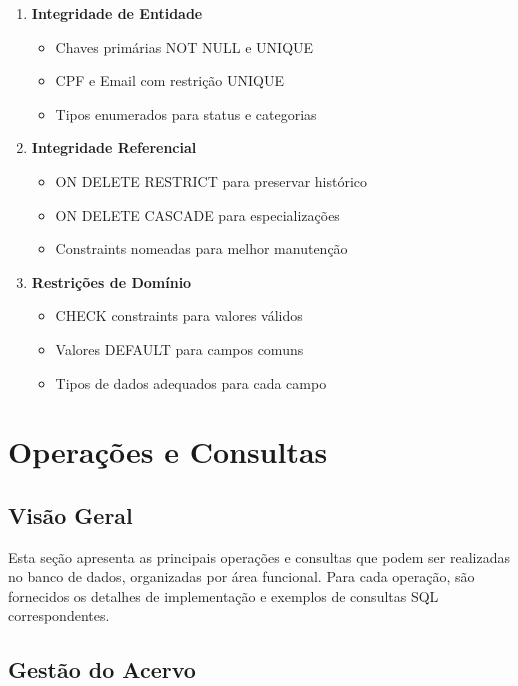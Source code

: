 \documentclass[12pt,a4paper]{article}
\begin{document}
\begin{tcolorbox}[title=Principais Restrições]
\begin{enumerate}[label=\textbf{RI\arabic*.}]
    \item \textbf{Integridade de Entidade}
    \begin{itemize}
        \item Chaves primárias NOT NULL e UNIQUE
        \item CPF e Email com restrição UNIQUE
        \item Tipos enumerados para status e categorias
    \end{itemize}

    \item \textbf{Integridade Referencial}
    \begin{itemize}
        \item ON DELETE RESTRICT para preservar histórico
        \item ON DELETE CASCADE para especializações
        \item Constraints nomeadas para melhor manutenção
    \end{itemize}

    \item \textbf{Restrições de Domínio}
    \begin{itemize}
        \item CHECK constraints para valores válidos
        \item Valores DEFAULT para campos comuns
        \item Tipos de dados adequados para cada campo
    \end{itemize}
\end{enumerate}
\end{tcolorbox}

\section{Operações e Consultas}

\subsection{Visão Geral}
Esta seção apresenta as principais operações e consultas que podem ser realizadas no banco de dados, organizadas por área funcional. Para cada operação, são fornecidos os detalhes de implementação e exemplos de consultas SQL correspondentes.

\subsection{Gestão do Acervo}
\end{document}
